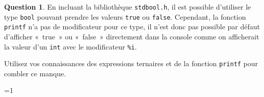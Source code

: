 \documentclass[11pt,a4paper,dvipsnames]{article}
\theoremstyle{definition}%
\newtheorem{Q}{Question}[] %
\newcounter{reponseCnt}
\begin{document}
\begin{Q}
En incluant la bibliothèque \texttt{stdbool.h}, il est possible d'utiliser le type \texttt{bool} pouvant prendre les valeurs \texttt{true} ou \texttt{false}.
Cependant, la fonction \texttt{printf} n'a pas de modificateur pour ce type, il n'est donc pas possible par défaut d'afficher «~true~» ou «~false~» directement dans la console comme on afficherait la valeur d'un \texttt{int} avec le modificateur \texttt{\%i}.

Utilisez vos connaissances des expressions ternaires et de la fonction \texttt{printf} pour combler ce manque.

\ifnum\value{reponseCnt}=1
  
\fi
\end{Q}
\end{document}
